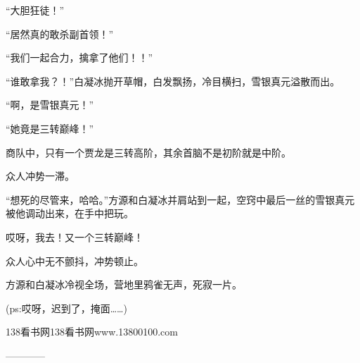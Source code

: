 \begin{this_body}
“大胆狂徒！”

“居然真的敢杀副首领！”

“我们一起合力，擒拿了他们！！”

“谁敢拿我？！”白凝冰抛开草帽，白发飘扬，冷目横扫，雪银真元溢散而出。

“啊，是雪银真元！”

“她竟是三转巅峰！”

商队中，只有一个贾龙是三转高阶，其余首脑不是初阶就是中阶。

众人冲势一滞。

“想死的尽管来，哈哈。”方源和白凝冰并肩站到一起，空窍中最后一丝的雪银真元被他调动出来，在手中把玩。

哎呀，我去！又一个三转巅峰！

众人心中无不颤抖，冲势顿止。

方源和白凝冰冷视全场，营地里鸦雀无声，死寂一片。

(ps:哎呀，迟到了，掩面……)

138看书网138看书网www.13800100.com

------------

\end{this_body}

